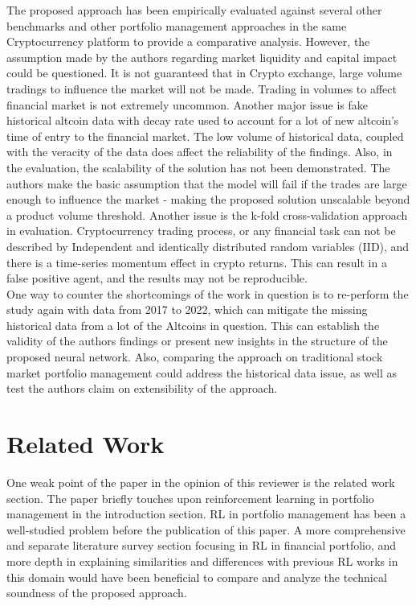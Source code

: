 \documentclass[twoside,11pt]{article}
\begin{document}
The proposed approach has been empirically evaluated against several other benchmarks and other portfolio management approaches in the same Cryptocurrency platform to provide a comparative analysis. However, the assumption made by the authors regarding market liquidity and capital impact could be questioned. It is not guaranteed that in Crypto exchange, large volume tradings to influence the market will not be made. Trading in volumes to affect financial market is not extremely uncommon. Another major issue is fake historical altcoin data with decay rate used to account for a lot of new altcoin's time of entry to the financial market. The low volume of historical data, coupled with the veracity of the data does affect the reliability of the findings. Also, in the evaluation, the scalability of the solution has not been demonstrated. The authors make the basic assumption that the model will fail if the trades are large enough to influence the market - making the proposed solution unscalable beyond a product volume threshold. Another issue is the k-fold cross-validation approach in evaluation.  Cryptocurrency trading process, or any financial task can not be described by Independent and identically distributed random variables (IID), and there is a time-series momentum effect in crypto returns. This can result in a false positive agent, and the results may not be reproducible. \\
One way to counter the shortcomings of the work in question is to re-perform the study again with data from 2017 to 2022, which can mitigate the missing historical data from a lot of the Altcoins in question. This can establish the validity of the authors findings or present new insights in the structure of the proposed neural network. Also, comparing the approach on traditional stock market portfolio management could address the historical data issue, as well as test the authors claim on extensibility of the approach. 

\section{Related Work}

One weak point of the paper in the opinion of this reviewer is the related work section. The paper briefly touches upon reinforcement learning in portfolio management in the introduction section. RL in portfolio management has been a well-studied problem before the publication of this paper. A more comprehensive and separate literature survey section focusing in RL in financial portfolio, and more depth in explaining similarities and differences with previous RL works in this domain would have been beneficial to compare and analyze the technical soundness of the proposed approach. 
\end{document}
